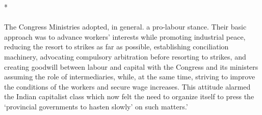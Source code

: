 \begin{center}*\end{center}

\paragraph*{}


The Congress Ministries adopted, in general. a pro-labour stance. Their basic approach was to advance workers' interests while promoting industrial peace, reducing the resort to strikes as far as possible, establishing conciliation machinery, advocating compulsory arbitration before resorting to strikes, and creating goodwill between labour and capital with the Congress and its ministers assuming the role of intermediaries, while, at the same time, striving to improve the conditions of the workers and secure wage increases. This attitude alarmed the Indian capitalist class which now felt the need to organize itself to press the `provincial governments to hasten slowly' on such matters.' 

